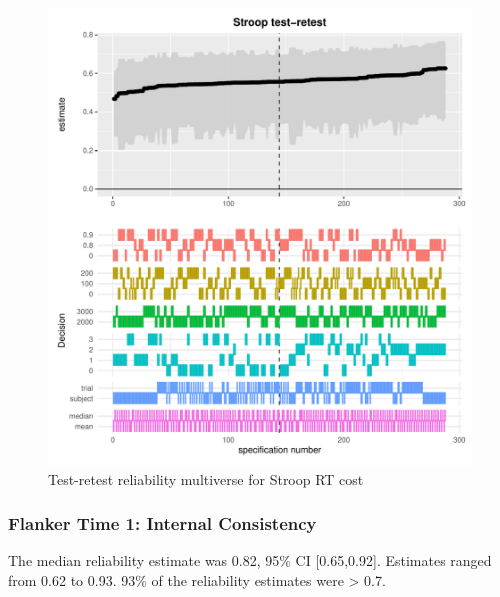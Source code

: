 \documentclass[
  man,floatsintext]{apa6}
\begin{document}
\begin{figure}
\centering
\includegraphics{Reliability_Multiverse_files/figure-latex/unnamed-chunk-7-1.pdf}
\caption{\label{fig:unnamed-chunk-7}Test-retest reliability multiverse for Stroop RT cost}
\end{figure}

\newpage

\hypertarget{flanker-time-1-internal-consistency}{%
\subsubsection{Flanker Time 1: Internal Consistency}\label{flanker-time-1-internal-consistency}}

The median reliability estimate was 0.82, 95\% CI {[}0.65,0.92{]}. Estimates ranged from 0.62 to 0.93. 93\% of the reliability estimates were \textgreater{} 0.7.
\end{document}
